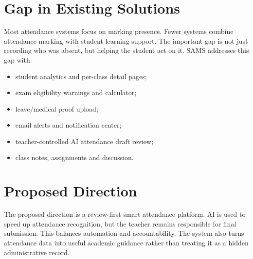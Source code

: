 \section{Gap in Existing Solutions}
Most attendance systems focus on marking presence. Fewer systems combine attendance marking with student learning support. The important gap is not just recording who was absent, but helping the student act on it. SAMS addresses this gap with:
\begin{itemize}
    \item student analytics and per-class detail pages;
    \item exam eligibility warnings and calculator;
    \item leave/medical proof upload;
    \item email alerts and notification center;
    \item teacher-controlled AI attendance draft review;
    \item class notes, assignments and discussion.
\end{itemize}

\section{Proposed Direction}
The proposed direction is a review-first smart attendance platform. AI is used to speed up attendance recognition, but the teacher remains responsible for final submission. This balances automation and accountability. The system also turns attendance data into useful academic guidance rather than treating it as a hidden administrative record.
